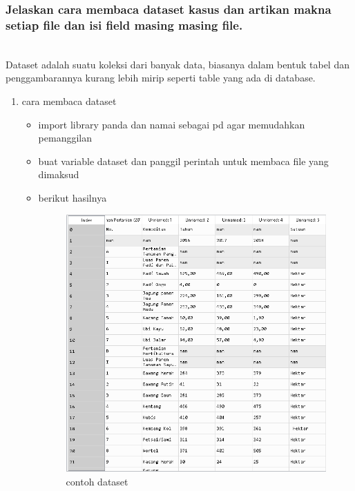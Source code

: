 \subsubsection{Jelaskan cara membaca dataset kasus dan artikan makna setiap ﬁle dan isi ﬁeld masing masing ﬁle.}
\hfill\\
Dataset adalah suatu koleksi dari banyak data, biasanya dalam bentuk tabel dan penggambarannya kurang lebih mirip seperti table yang ada di database.
\begin{enumerate}
\item cara membaca dataset
\hfill\\

	\begin{itemize}
	\item import library panda dan namai sebagai pd agar memudahkan pemanggilan
	\item buat variable dataset dan panggil perintah untuk membaca file yang dimaksud
	\hfill\\	
	\item berikut hasilnya
	\hfill\\
\begin{figure}[H]
	\centering
	\includegraphics[width=12cm]{figures/1174089/3/hasilbacadataset.PNG}
	\caption{contoh dataset}
\end{figure}
\end{itemize}
\end{enumerate}

